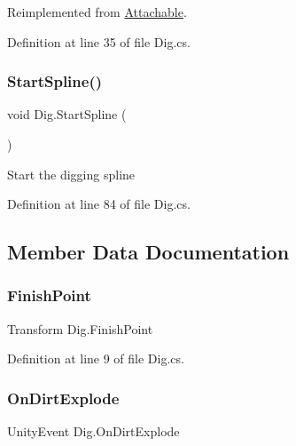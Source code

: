Reimplemented from \mbox{\hyperlink{class_attachable_a3c05c0b07b831881a7ab245057d34d30}{Attachable}}.



Definition at line 35 of file Dig.\+cs.

\mbox{\label{class_dig_ad8530d5a6d6c5ae296f722f3d2a618d4}} 
\subsubsection{\texorpdfstring{Start\+Spline()}{StartSpline()}}
{\footnotesize\ttfamily void Dig.\+Start\+Spline (\begin{DoxyParamCaption}{ }\end{DoxyParamCaption})}



Start the digging spline 



Definition at line 84 of file Dig.\+cs.



\subsection{Member Data Documentation}
\mbox{\label{class_dig_abe73eea22eaad35e4e5e1d5d358449d9}} 
\subsubsection{\texorpdfstring{Finish\+Point}{FinishPoint}}
{\footnotesize\ttfamily Transform Dig.\+Finish\+Point}



Definition at line 9 of file Dig.\+cs.

\mbox{\label{class_dig_a02ef58f6d518aa38c5a21cb0409738e7}} 
\subsubsection{\texorpdfstring{On\+Dirt\+Explode}{OnDirtExplode}}
{\footnotesize\ttfamily Unity\+Event Dig.\+On\+Dirt\+Explode}



